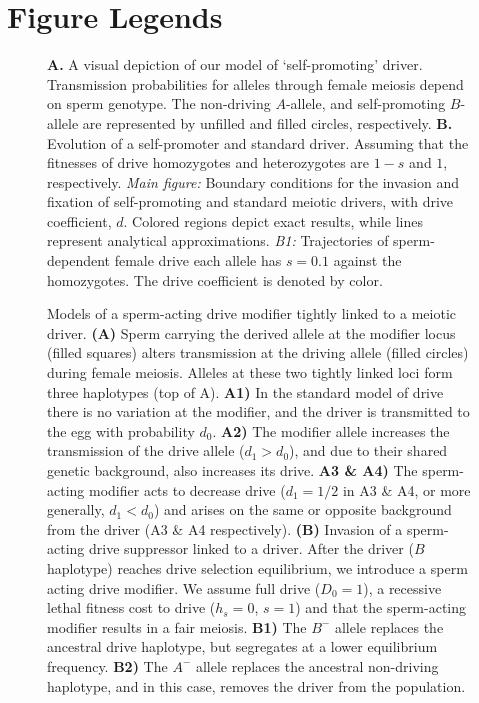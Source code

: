 \documentclass[12pt,letterpaper]{article}
\begin{document}
\section*{Figure Legends}
\clearpage
\begin{figure}
\caption{{\bf{A.}} A visual depiction of our model of `self-promoting' driver. 
	Transmission probabilities for alleles through female
 	 meiosis depend on sperm genotype. 
	 The non-driving $A$-allele, and self-promoting $B$-allele
	 are represented by unfilled and filled circles, respectively. 
	 {\bf{B.}} Evolution of a self-promoter and standard driver. 
	 	Assuming that the fitnesses of drive homozygotes and 
		heterozygotes are $1-s$ and $1$, respectively. 
	 	\emph{Main figure:} Boundary conditions for the invasion 
		and fixation of self-promoting and standard meiotic drivers, 
		with drive coefficient, $d$. Colored regions depict exact results, 
		while lines  represent analytical approximations. 
	 \emph{B1:}  Trajectories of sperm-dependent female drive
		 each allele has $s =0.1$ against the
		 homozygotes.  The drive coefficient is denoted by color. 
 }   
\label{Eggsperm}
\end{figure}

\clearpage
\newpage

\begin{figure}
\begin{center}
          \end{center}
\caption{Models of a sperm-acting drive modifier tightly linked to a meiotic driver. 
{\bf (A) } 
Sperm carrying the derived allele at the modifier locus (filled squares) alters transmission  
	at the driving allele (filled circles) during female meiosis.
        Alleles at these two tightly linked loci form three haplotypes (top of A). 	
	{\bf{A1)}} In the standard model of drive there is no
        variation at the modifier, 
	and the driver is transmitted to the egg with probability $d_0$. 
	{\bf{A2)}} The modifier allele increases the transmission of the drive allele ($d_1 > d_0$), and due to their shared genetic background, also increases its drive. 
	{\bf{A3 \& A4)}} The sperm-acting modifier acts to decrease
        drive  ($d_1=1/2$ in A3 \& A4, or more generally, $d_1 < d_0$) and arises on the same or opposite
        background from the driver (A3 \& A4 respectively). 
{\bf{(B)}} Invasion of a sperm-acting drive suppressor linked to a driver. 
	After the driver ($B$ haplotype) reaches drive selection equilibrium, we introduce a sperm acting drive modifier. 
	We assume full drive ($D_0 =1$), a recessive lethal fitness cost to drive ($h_s=0$, $s=1$) and that the sperm-acting modifier results in a fair meiosis. 
{\bf {B1)}} The $B^-$ allele replaces the ancestral drive haplotype, but segregates at a lower equilibrium frequency.
{\bf {B2)}} The $A^-$ allele replaces the ancestral non-driving haplotype, and in this case, removes the driver from the population. }
 \label{Eggsperm_3_allele_cartoon}
\end{figure}
\end{document}
